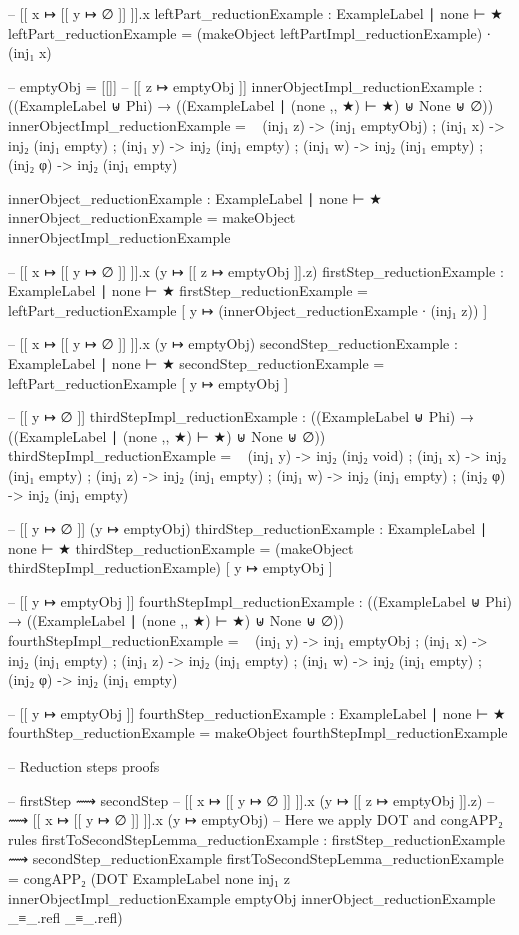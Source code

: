 -- [[ x ↦ [[ y ↦ ∅ ]] ]].x
leftPart_reductionExample : ExampleLabel ∣ none ⊢ ★
leftPart_reductionExample =
  (makeObject leftPartImpl_reductionExample) ∙ (inj₁ x)

-- emptyObj = [[]]
-- [[ z ↦ emptyObj ]]
innerObjectImpl_reductionExample :
  ((ExampleLabel ⊎ Phi) → ((ExampleLabel ∣ (none ,, ★) ⊢ ★) ⊎ None ⊎ ∅))
innerObjectImpl_reductionExample = \ {  
  (inj₁ z) -> (inj₁ emptyObj) ;
  (inj₁ x) -> inj₂ (inj₁ empty) ;
  (inj₁ y) -> inj₂ (inj₁ empty) ;
  (inj₁ w) -> inj₂ (inj₁ empty) ;
  (inj₂ φ) -> inj₂ (inj₁ empty) }

innerObject_reductionExample : ExampleLabel ∣ none ⊢ ★
innerObject_reductionExample = makeObject innerObjectImpl_reductionExample

-- [[ x ↦ [[ y ↦ ∅ ]] ]].x (y ↦ [[ z ↦ emptyObj ]].z)
firstStep_reductionExample : ExampleLabel ∣ none ⊢ ★
firstStep_reductionExample =
  leftPart_reductionExample [ y ↦ (innerObject_reductionExample ∙ (inj₁ z)) ]

-- [[ x ↦ [[ y ↦ ∅ ]] ]].x (y ↦ emptyObj)
secondStep_reductionExample : ExampleLabel ∣ none ⊢ ★
secondStep_reductionExample = leftPart_reductionExample [ y ↦ emptyObj ]

-- [[ y ↦ ∅ ]]
thirdStepImpl_reductionExample :
  ((ExampleLabel ⊎ Phi) → ((ExampleLabel ∣ (none ,, ★) ⊢ ★) ⊎ None ⊎ ∅))
thirdStepImpl_reductionExample = \ {  
  (inj₁ y) -> inj₂ (inj₂ void) ; 
  (inj₁ x) -> inj₂ (inj₁ empty) ;
  (inj₁ z) -> inj₂ (inj₁ empty) ;
  (inj₁ w) -> inj₂ (inj₁ empty) ;
  (inj₂ φ) -> inj₂ (inj₁ empty) }

-- [[ y ↦ ∅ ]] (y ↦ emptyObj)
thirdStep_reductionExample : ExampleLabel ∣ none ⊢ ★
thirdStep_reductionExample =
  (makeObject thirdStepImpl_reductionExample) [ y ↦ emptyObj ]


-- [[ y ↦ emptyObj ]]
fourthStepImpl_reductionExample :
  ((ExampleLabel ⊎ Phi) → ((ExampleLabel ∣ (none ,, ★) ⊢ ★) ⊎ None ⊎ ∅))
fourthStepImpl_reductionExample = \ {  
  (inj₁ y) -> inj₁ emptyObj ; 
  (inj₁ x) -> inj₂ (inj₁ empty) ;
  (inj₁ z) -> inj₂ (inj₁ empty) ;
  (inj₁ w) -> inj₂ (inj₁ empty) ;
  (inj₂ φ) -> inj₂ (inj₁ empty) }

-- [[ y ↦ emptyObj ]]
fourthStep_reductionExample : ExampleLabel ∣ none ⊢ ★
fourthStep_reductionExample = makeObject fourthStepImpl_reductionExample


-- Reduction steps proofs

-- firstStep ⟿ secondStep
-- [[ x ↦ [[ y ↦ ∅ ]] ]].x (y ↦ [[ z ↦ emptyObj ]].z)
--  ⟿ [[ x ↦ [[ y ↦ ∅ ]] ]].x (y ↦ emptyObj)
-- Here we apply DOT and congAPP₂ rules
firstToSecondStepLemma_reductionExample :
  firstStep_reductionExample ⟿ secondStep_reductionExample
firstToSecondStepLemma_reductionExample =
  congAPP₂ (DOT 
    {ExampleLabel}
    {none}
    {inj₁ z}
    {innerObjectImpl_reductionExample}
    {emptyObj}
    {innerObject_reductionExample}
    {_≡_.refl} {_≡_.refl})


